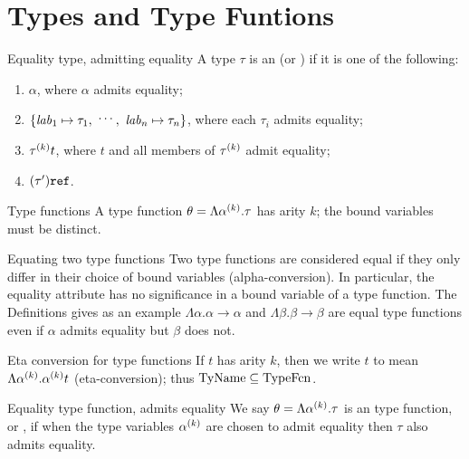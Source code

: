 \section{Types and Type Funtions}\label{section:type-functions}

\begin{definition}{Equality type, admitting equality}
A type $\tau$ is an  (or )
if it is one of the following:
\begin{enumerate}
\item $\alpha$, where $\alpha$ admits equality;
\item $\{\lab_{1}\mapsto\tau_{1},\ \syndots,\ \lab_{n}\mapsto\tau_{n}\}$,
      where each $\tau_{i}$ admits equality;
\item $\mbox{$\tau^{(k)}$}t$, where $t$ and all members of $\mbox{$\tau^{(k)}$}$ admit equality;
\item $(\tau')\mbox{\tt ref}$.
\end{enumerate}
\end{definition}

\begin{clause}{Type functions}
A type function $\theta=\Lambda\mbox{$\alpha^{(k)}$}.\tau$ has arity $k$; the bound
variables must be distinct.
\end{clause}

\begin{clause}{Equating two type functions}\label{convention:static-core:equating-type-functions}
Two type functions are considered equal if they only differ in their
choice of bound variables (alpha-conversion). In particular, the
equality attribute has no significance in a bound variable of a type function.
The Definitions gives as an example $\Lambda\alpha.\alpha\to
\alpha$ and $\Lambda\beta.\beta\to\beta$ are equal type functions
even if $\alpha$ admits equality but $\beta$ does not.
\end{clause}

\begin{clause}{Eta conversion for type functions}
If $t$ has arity $k$, then we write $t$ to mean $\Lambda\mbox{$\alpha^{(k)}$}.\mbox{$\alpha^{(k)}$}t$
(eta-conversion); thus ${\rm TyName}\subseteq{\rm TypeFcn}$.
\end{clause}

\begin{definition}{Equality type function, admits equality}
We say $\theta=\Lambda\mbox{$\alpha^{(k)}$}.\tau$
is an  type function, or , if when the
type variables $\mbox{$\alpha^{(k)}$}$ are chosen to admit equality then $\tau$ also admits
equality.
\end{definition}

